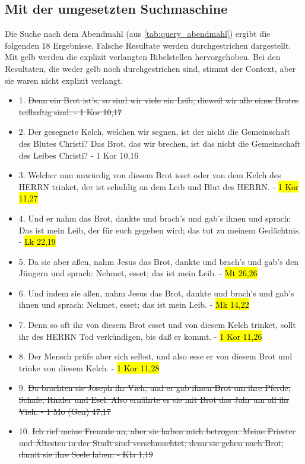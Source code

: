 \subsection{Mit der umgesetzten Suchmaschine}
Die Suche nach dem Abendmahl (aus \cref{tab:query_abendmahl}) ergibt die folgenden 18 Ergebnisse.
Falsche Resultate werden durchgestrichen dargestellt. Mit gelb werden die explizit verlangten Bibelstellen hervorgehoben.
Bei den Resultaten, die weder gelb noch durchgestrichen sind, stimmt der Context, aber sie waren nicht explizit verlangt.\\
\begin{itemize}[noitemsep]
	\item 1.	\st{Denn ein Brot ist's, so sind wir viele ein Leib, dieweil wir alle eines Brotes teilhaftig sind. - 1 Kor 10,17}
	\item 2.	Der gesegnete Kelch, welchen wir segnen, ist der nicht die Gemeinschaft des Blutes Christi? Das Brot, das wir brechen, ist das nicht die Gemeinschaft des Leibes Christi? - 1 Kor 10,16
	\item 3.	Welcher nun unwürdig von diesem Brot isset oder von dem Kelch des HERRN trinket, der ist schuldig an dem Leib und Blut des HERRN. - \hl{1 Kor 11,27}
	\item 4.	Und er nahm das Brot, dankte und brach's und gab's ihnen und sprach: Das ist mein Leib, der für euch gegeben wird; das tut zu meinem Gedächtnis. - \hl{Lk 22,19}
	\item 5.	Da sie aber aßen, nahm Jesus das Brot, dankte und brach's und gab's den Jüngern und sprach: Nehmet, esset; das ist mein Leib. - \hl{Mt 26,26}
	\item 6.	Und indem sie aßen, nahm Jesus das Brot, dankte und brach's und gab's ihnen und sprach: Nehmet, esset; das ist mein Leib. - \hl{Mk 14,22}
	\item 7.	Denn so oft ihr von diesem Brot esset und von diesem Kelch trinket, sollt ihr des HERRN Tod verkündigen, bis daß er kommt. - \hl{1 Kor 11,26}
	\item 8.	Der Mensch prüfe aber sich selbst, und also esse er von diesem Brot und trinke von diesem Kelch. - \hl{1 Kor 11,28}
	\item 9.	\st{Da brachten sie Joseph ihr Vieh; und er gab ihnen Brot um ihre Pferde, Schafe, Rinder und Esel. Also ernährte er sie mit Brot das Jahr um all ihr Vieh. - 1 Mo (Gen) 47,17}
	\item 10.	\st{Ich rief meine Freunde an, aber sie haben mich betrogen. Meine Priester und Ältesten in der Stadt sind verschmachtet; denn sie gehen nach Brot, damit sie ihre Seele laben. - Kla 1,19}

\end{itemize}
